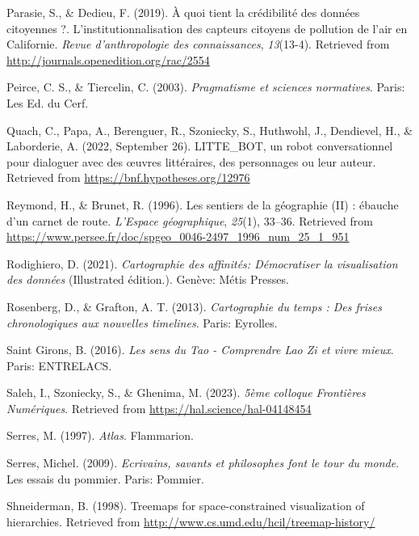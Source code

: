 \documentclass[
  a4paper,
  DIV=11,
  numbers=noendperiod]{scrreprt}
\newlength{\cslhangindent}
\newenvironment{CSLReferences}[2] %
 {\begin{list}{}{%
  \setlength{\itemindent}{0pt}
  \setlength{\leftmargin}{0pt}
  \setlength{\parsep}{0pt}
  \ifodd #1
   \setlength{\leftmargin}{\cslhangindent}
   \setlength{\itemindent}{-1\cslhangindent}
  \fi
  \setlength{\itemsep}{#2\baselineskip}}}
 {\end{list}}
\begin{document}
\begin{CSLReferences}{1}{0}
Parasie, S., \& Dedieu, F. (2019). À quoi tient la crédibilité des
données citoyennes ?. L{'}institutionnalisation des capteurs citoyens de
pollution de l{'}air en Californie. \emph{Revue d{'}anthropologie des
connaissances}, \emph{13}(13-4). Retrieved from
\url{http://journals.openedition.org/rac/2554}

Peirce, C. S., \& Tiercelin, C. (2003). \emph{Pragmatisme et sciences
normatives}. Paris: Les Ed. du Cerf.

Quach, C., Papa, A., Berenguer, R., Szoniecky, S., Huthwohl, J.,
Dendievel, H., \& Laborderie, A. (2022, September 26). LITTE{\_}BOT, un
robot conversationnel pour dialoguer avec des {œ}uvres littéraires, des
personnages ou leur auteur. Retrieved from
\url{https://bnf.hypotheses.org/12976}

Reymond, H., \& Brunet, R. (1996). Les sentiers de la géographie (II) :
ébauche d'un carnet de route. \emph{L'Espace géographique},
\emph{25}(1), 33--36. Retrieved from
\url{https://www.persee.fr/doc/spgeo_0046-2497_1996_num_25_1_951}

Rodighiero, D. (2021). \emph{Cartographie des affinités: Démocratiser la
visualisation des données} (Illustrated édition.). Genève: Métis
Presses.

Rosenberg, D., \& Grafton, A. T. (2013). \emph{Cartographie du temps :
Des frises chronologiques aux nouvelles timelines}. Paris: Eyrolles.

Saint Girons, B. (2016). \emph{Les sens du Tao - Comprendre Lao Zi et
vivre mieux}. Paris: ENTRELACS.

Saleh, I., Szoniecky, S., \& Ghenima, M. (2023). \emph{5ème colloque
Frontières Numériques}. Retrieved from
\url{https://hal.science/hal-04148454}

Serres, M. (1997). \emph{Atlas}. Flammarion.

Serres, Michel. (2009). \emph{Ecrivains, savants et philosophes font le
tour du monde}. Les essais du pommier. Paris: Pommier.

Shneiderman, B. (1998). Treemaps for space-constrained visualization of
hierarchies. Retrieved from
\url{http://www.cs.umd.edu/hcil/treemap-history/}


\end{CSLReferences}
\end{document}
